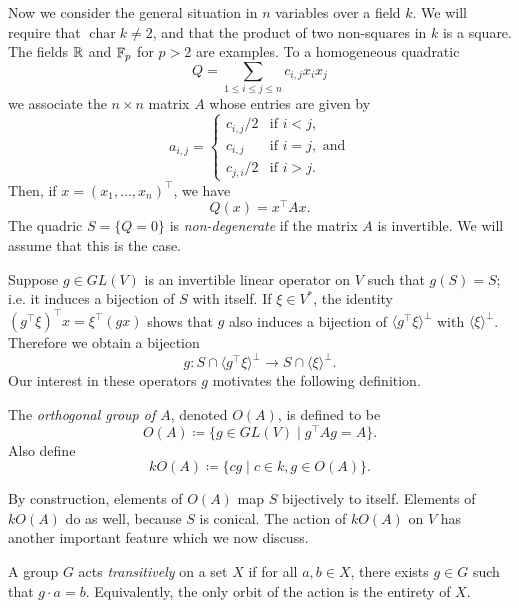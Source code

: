 Now we consider the general situation in $n$ variables over a field $k$. We will require that $\operatorname{char} k \neq 2$, and that the product of two non-squares in $k$ is a square. The fields $\mathbb{R}$ and $\mathbb{F}_p$ for $p>2$ are examples. To a homogeneous quadratic
\[
	Q = \sum_{1 \leq i \leq j \leq n} c_{i,j} x_i x_j 
\]
we associate the $n\times n$ matrix $A$ whose entries are given by
\[
	a_{i,j} = \begin{cases}
		{c_{i,j}}/{2} & \text{if } i < j,\\
		c_{i,j} & \text{if } i = j, \text{ and}\\
		{c_{j,i}}/{2} & \text{if } i > j.
	\end{cases}
\]
Then, if $x = (x_1,\ldots,x_n)^\top$, we have
\[
	Q(x) = x^\top A x.
\]
The quadric $S = \{Q = 0\}$ is \emph{non-degenerate} if the matrix $A$ is invertible. We will assume that this is the case.

Suppose $g \in GL(V)$ is an invertible linear operator on $V$ such that $g(S) = S$; i.e. it induces a bijection of $S$ with itself. If $\xi \in V^*$, the identity $(g^\top \xi)^\top x = \xi^\top (gx)$ shows that $g$ also induces a bijection of $\langle g^\top \xi \rangle^\bot$ with $\langle \xi \rangle^\bot$. Therefore we obtain a bijection
\begin{equation}\label{eq:S-operator-hyperplane-bijection}
	g\colon S \cap \langle g^\top \xi \rangle^\bot \to S \cap \langle \xi \rangle^\bot.
\end{equation}
Our interest in these operators $g$ motivates the following definition.
\begin{defn}
	The \emph{orthogonal group of $A$}, denoted $O(A)$, is defined to be
	\[
		O(A) \coloneqq \{ g \in GL(V) \mid g^\top A g = A\}.
	\]
	Also define
	\[
		kO(A) \coloneqq \{ cg \mid c\in k, g\in O(A)\}.
	\]
\end{defn}
By construction, elements of $O(A)$ map $S$ bijectively to itself. Elements of $kO(A)$ do as well, because $S$ is conical. The action of $kO(A)$ on $V$ has another important feature which we now discuss. 
\begin{defn}
	A group $G$ acts \emph{transitively} on a set $X$ if for all $a,b\in X$, there exists $g\in G$ such that $g\cdot a = b$. Equivalently, the only orbit of the action is the entirety of $X$.
\end{defn}

